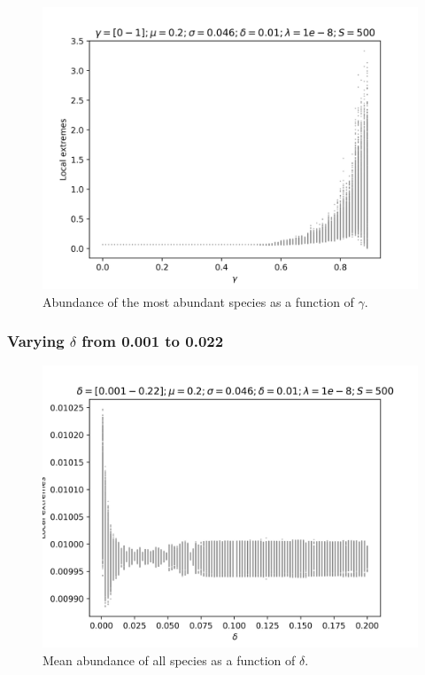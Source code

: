 \documentclass{article}
\begin{document}
\begin{figure}[H]
    \centering
    \includegraphics[width=\linewidth]{Bifurcation/BifurcationM1.png}
    \caption{Abundance of the most abundant species as a function of $\gamma$.}
\end{figure}
\clearpage

\subsubsection{Varying $\delta$ from 0.001 to 0.022}

\begin{figure}[H]
    \centering
    \includegraphics[width=\linewidth]{Bifurcation/BifurcationMeanDelta.png}
    \caption{Mean abundance of all species as a function of $\delta$.}
\end{figure}
\end{document}
